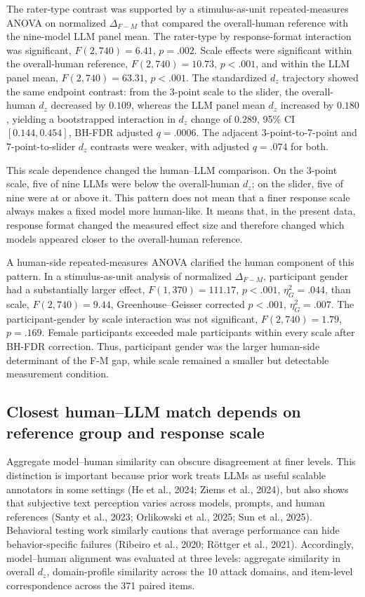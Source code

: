 \documentclass[a4paper,fleqn,review]{cas-sc}
\begin{document}
The rater-type contrast was supported by a stimulus-as-unit repeated-measures ANOVA on normalized $\Delta_{F-M}$ that compared the overall-human reference with the nine-model LLM panel mean. The rater-type by response-format interaction was significant, $F(2, 740) = 6.41$, $p = .002$. Scale effects were significant within the overall-human reference, $F(2, 740) = 10.73$, $p < .001$, and within the LLM panel mean, $F(2, 740) = 63.31$, $p < .001$. The standardized $d_z$ trajectory showed the same endpoint contrast: from the 3-point scale to the slider, the overall-human $d_z$ decreased by $0.109$, whereas the LLM panel mean $d_z$ increased by $0.180$, yielding a bootstrapped interaction in $d_z$ change of $0.289$, 95\% CI $[0.144, 0.454]$, BH-FDR adjusted $q = .0006$. The adjacent 3-point-to-7-point and 7-point-to-slider $d_z$ contrasts were weaker, with adjusted $q = .074$ for both.

This scale dependence changed the human--LLM comparison. On the 3-point scale, five of nine LLMs were below the overall-human $d_z$; on the slider, five of nine were at or above it. This pattern does not mean that a finer response scale always makes a fixed model more human-like. It means that, in the present data, response format changed the measured effect size and therefore changed which models appeared closer to the overall-human reference.

A human-side repeated-measures ANOVA clarified the human component of this pattern. In a stimulus-as-unit analysis of normalized $\Delta_{F-M}$, participant gender had a substantially larger effect, $F(1, 370) = 111.17$, $p < .001$, $\eta^2_G = .044$, than scale, $F(2, 740) = 9.44$, Greenhouse--Geisser corrected $p < .001$, $\eta^2_G = .007$. The participant-gender by scale interaction was not significant, $F(2, 740) = 1.79$, $p = .169$. Female participants exceeded male participants within every scale after BH-FDR correction. Thus, participant gender was the larger human-side determinant of the F-M gap, while scale remained a smaller but detectable measurement condition.

\subsection{Closest human--LLM match depends on reference group and response scale}
\label{sec:result-closeness}

Aggregate model--human similarity can obscure disagreement at finer levels. This distinction is important because prior work treats LLMs as useful scalable annotators in some settings (He et al., 2024; Ziems et al., 2024), but also shows that subjective text perception varies across models, prompts, and human references (Santy et al., 2023; Orlikowski et al., 2025; Sun et al., 2025). Behavioral testing work similarly cautions that average performance can hide behavior-specific failures (Ribeiro et al., 2020; R\"ottger et al., 2021). Accordingly, model--human alignment was evaluated at three levels: aggregate similarity in overall $d_z$, domain-profile similarity across the 10 attack domains, and item-level correspondence across the 371 paired items.
\end{document}
